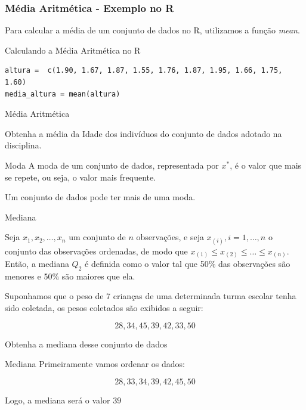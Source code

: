 \begin{frame}[fragile]
\frametitle{Média Aritmética - Exemplo no R}    
Para calcular a média de um conjunto de dados no R, utilizamos a função \textit{mean}.
\begin{block}{Calculando a Média Aritmética no R}
\begin{verbatim}
altura =  c(1.90, 1.67, 1.87, 1.55, 1.76, 1.87, 1.95, 1.66, 1.75, 1.60)
media_altura = mean(altura)
\end{verbatim}
\end{block}
\end{frame}

\begin{frame}{Média Aritmética}
\begin{exemplo}
    Obtenha a média da Idade dos indivíduos do conjunto de dados adotado na disciplina.
\end{exemplo}    
\end{frame}

\begin{frame}{Moda}
    A moda de um conjunto de dados, representada por $x^*$, é o valor que mais se repete, 
    ou seja, o valor mais frequente. 
    \pause

    \begin{atencao}
        Um conjunto de dados pode ter mais de uma moda.
    \end{atencao}
\end{frame}

\begin{frame}{Mediana}

Seja $x_1, x_2, \dots, x_n$ um conjunto de $n$ observações, e seja $x_{(i)}, i=1, \dots, n$
o conjunto das observações ordenadas, de modo que $x_{(1)} \leq x_{(2)} \leq \dots \leq x_{(n)}$.
Então, a mediana $Q_2$ é definida como o valor tal que 50\% das observações são menores
e 50\% são maiores que ela. 
\pause
\begin{exemplo}   

Suponhamos que o peso de 7 crianças de uma determinada turma escolar tenha sido coletada, os pesos coletados são exibidos a seguir:

$$28, 34, 45, 39, 42, 33, 50$$

Obtenha a mediana desse conjunto de dados
\end{exemplo}
\end{frame}

\begin{frame}{Mediana}
Primeiramente vamos ordenar os dados:

$$28, 33, 34, 39, 42, 45,  50$$

\pause 
Logo, a mediana será o valor $39$

\end{frame}

